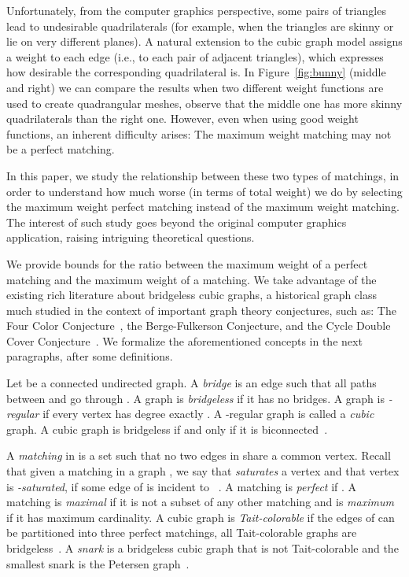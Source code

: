 \documentclass{article}
\begin{document}
Unfortunately, from the computer graphics perspective, some pairs of triangles lead to undesirable quadrilaterals (for example, when the triangles are skinny or lie on very different planes). 
A natural extension to the cubic graph model assigns a weight to each edge (i.e., to each pair of adjacent triangles), which expresses how desirable the corresponding quadrilateral is. 
In Figure~\ref{fig:bunny} (middle and right) we can compare the results when two different weight functions are used to create  quadrangular meshes, observe that the middle one has more skinny quadrilaterals than the right one.
However, even when using good weight functions, an inherent difficulty arises: The maximum weight matching may not be a perfect matching.

In this paper, we study the relationship between these two types of matchings, in order to understand how much worse (in terms of total weight) we do by selecting the maximum weight perfect matching instead of the maximum weight matching. The interest of such study goes beyond the original computer graphics application, raising intriguing theoretical questions.

We provide bounds for the ratio between the maximum weight of a perfect matching and the maximum weight of a matching. We take advantage of the existing rich literature about bridgeless cubic graphs, a historical graph class much studied in the context of important graph theory conjectures, such as: The Four Color Conjecture~\cite{Appel}, the Berge-Fulkerson Conjecture, and the Cycle Double Cover Conjecture~\cite{Celmins}. We formalize the aforementioned concepts in the next paragraphs, after some definitions.

Let  be a connected undirected graph. A \emph{bridge} is an edge  such that all paths between  and  go through . A graph is \emph{bridgeless} if it has no bridges. A graph is \emph{-regular} if every vertex has degree exactly . A -regular graph is called a \emph{cubic} graph. A cubic graph is bridgeless if and only if it is biconnected~\cite{bm}.

A \emph{matching} in  is a set  such that no two edges in  share a common vertex. Recall that given a matching  in a graph , we say that  \emph{saturates} a vertex  and that vertex  is \emph{-saturated}, if some edge of  is incident to ~\cite{bm}.
A matching  is \emph{perfect} if . 
A matching is \emph{maximal} if it is not a subset of any other matching and is \emph{maximum} if it has maximum cardinality. 
 A cubic graph  is \emph{Tait-colorable} if the edges of  can be
partitioned into three perfect matchings, all Tait-colorable graphs
are bridgeless~\cite{bm}. A \emph{snark} is a bridgeless cubic graph
that is not Tait-colorable and the smallest snark is the Petersen graph~\cite{isaacs75}.
\end{document}
